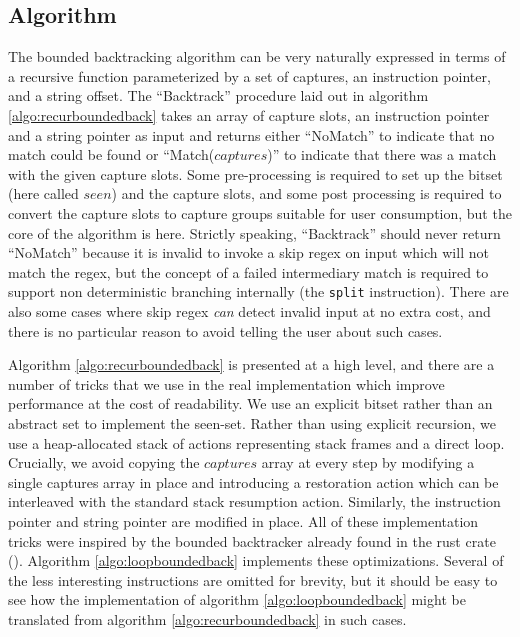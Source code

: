 \subsection{Algorithm}

The bounded backtracking algorithm can be very naturally expressed
in terms of a recursive function parameterized by a set of captures,
an instruction pointer, and a string offset.  The ``Backtrack'' procedure
laid out in algorithm \ref{algo:recurboundedback} takes an array of capture
slots, an instruction pointer and a string pointer as input and returns
either ``NoMatch'' to indicate that no match could be found
or ``Match($captures$)'' to indicate that there was a match with the
given capture slots. Some pre-processing is required to
set up the bitset (here called $seen$) and the capture slots,
and some post processing is required to convert the capture slots
to capture groups suitable for user consumption, but the core
of the algorithm is here. Strictly speaking, ``Backtrack'' should
never return ``NoMatch'' because it is invalid to invoke a skip
regex on input which will not match the regex, but the concept of
a failed intermediary match is required to support non deterministic
branching internally (the \verb'split' instruction). There are also
some cases where skip regex \emph{can} detect invalid input at no
extra cost, and there is no particular reason to avoid telling the
user about such cases.

Algorithm \ref{algo:recurboundedback} is presented at a
high level, and there are a number of tricks that we use in the
real implementation which improve performance at the cost of
readability. We use an explicit bitset rather than an abstract
set to implement the seen-set. Rather than using explicit recursion,
we use a heap-allocated stack of actions representing stack frames
and a direct loop.
Crucially, we avoid copying the $captures$ array at every step by
modifying a single captures array in place and introducing a restoration
action which can be interleaved with the standard stack resumption action.
Similarly, the instruction pointer and string pointer are modified
in place. All of these implementation tricks were inspired by the
bounded backtracker already found in the rust crate (\cite{GallantRegex}).
Algorithm \ref{algo:loopboundedback} implements these
optimizations. Several of the less interesting instructions are
omitted for brevity, but it should be easy to see how the implementation
of algorithm \ref{algo:loopboundedback}
might be translated from algorithm \ref{algo:recurboundedback} in
such cases.

